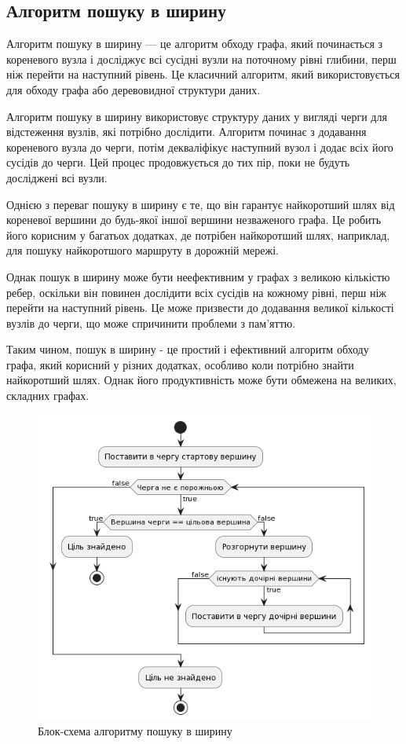 \subsection{Алгоритм пошуку в ширину}
\label{subsec:bfs-subsection}

Алгоритм пошуку в ширину --- це алгоритм обходу графа, який починається з кореневого вузла і досліджує всі сусідні вузли на поточному рівні глибини, перш ніж перейти на наступний рівень. Це класичний алгоритм, який використовується для обходу графа або деревовидної структури даних.

Алгоритм пошуку в ширину використовує структуру даних у вигляді черги для відстеження вузлів, які потрібно дослідити. Алгоритм починає з додавання кореневого вузла до черги, потім декваліфікує наступний вузол і додає всіх його сусідів до черги. Цей процес продовжується до тих пір, поки не будуть досліджені всі вузли.

Однією з переваг пошуку в ширину є те, що він гарантує найкоротший шлях від кореневої вершини до будь-якої іншої вершини незваженого графа. Це робить його корисним у багатьох додатках, де потрібен найкоротший шлях, наприклад, для пошуку найкоротшого маршруту в дорожній мережі.

Однак пошук в ширину може бути неефективним у графах з великою кількістю ребер, оскільки він повинен дослідити всіх сусідів на кожному рівні, перш ніж перейти на наступний рівень. Це може призвести до додавання великої кількості вузлів до черги, що може спричинити проблеми з пам'яттю.

Таким чином, пошук в ширину - це простий і ефективний алгоритм обходу графа, який корисний у різних додатках, особливо коли потрібно знайти найкоротший шлях. Однак його продуктивність може бути обмежена на великих, складних графах.\\

\begin{figure}[!htp]
    \centering
    \includegraphics[scale=0.6]{content/chapters/2-implementation-methods/assets/img/bfs_algorithm.png}
    \caption{Блок-схема алгоритму пошуку в ширину}
    \label{fig:bfs}
\end{figure}


